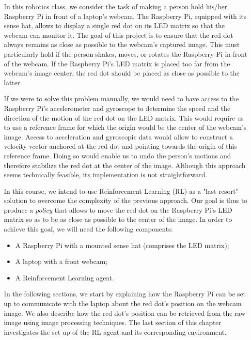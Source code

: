 
In this robotics class, we consider the task of making a person hold his/her Raspberry Pi in front of a laptop's webcam.  The Raspberry Pi, equipped with its sense hat,  allows to display a single red dot on its LED matrix so that the webcam can monitor it. The goal of this project is to ensure that the red dot always remains as close as possible to the webcam's captured image. This must particularly hold if the person shakes, moves, or rotates the Raspberry Pi in front of the webcam. If the Raspberry Pi's LED matrix is placed too far from the webcam's image center, the red dot should be placed as close as possible to the latter.

If we were to solve this problem manually, we would need to have access to the Raspberry Pi's accelerometer and gyroscope to determine the speed and the direction of the motion of the red dot on the LED matrix. This would require us to use a reference frame for which the origin would be the center of the webcam's image. Access to acceleration and gyroscopic data would allow to construct a velocity vector anchored at the red dot and pointing towards the origin of this reference frame. Doing so would enable us to undo the person's motions and therefore stabilize the red dot at the center of the image. Although this approach seems technically feasible, its implementation is not straightforward. 

In this course, we intend to use Reinforcement Learning (RL) as a "last-resort" solution to overcome the complexity of the previous approach. Our goal is thus to produce a \textit{policy} that allows to move the red dot on the Raspberry Pi's LED matrix so as to be as close as possible to the center of the image. In order to achieve this goal, we will need the following components:

\begin{itemize}
	\item A Raspberry Pi with a mounted sense hat (comprises the LED matrix);
	\item A laptop with a front webcam;
	\item A Reinforcement Learning agent.
\end{itemize}

In the following sections, we start by explaining how the Raspberry Pi can be set up to communicate with the laptop about the red dot's position on the webcam image.  We also describe how the red dot's position can be retrieved from the raw image using image processing techniques. The last section of this chapter investigates the set up of the RL agent and its corresponding environment.


